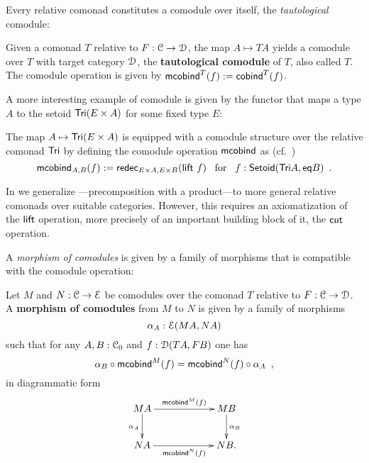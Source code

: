 \documentclass[a4paper,USenglish]{lipics}
\newcommand{\fat}[1]{\textbf{#1}}
\begin{document}
\noindent
Every relative comonad constitutes a comodule over itself, the \emph{tautological} comodule:

\begin{defn}
\label{def:tautological_comodule}
  Given a comonad $T$ relative to $F:\C\to\D$, the map $A \mapsto TA$ yields a comodule over $T$ 
  with target category $\D$, the \textbf{tautological comodule} of $T$, also called $T$.
  The comodule operation is given by
    $  \mcobind^T(f) := \cobind^T(f)$. 
\end{defn}

\noindent
A more interesting example of comodule is given by the functor that maps a type $A$ to the setoid $\Tri(E\times A)$
for some fixed type $E$:
\begin{ex}\label{ex_tri_prod_comod}
   The map $A \mapsto \Tri(E\times A)$ is equipped with a comodule structure over the relative comonad $\Tri$ by
   defining the comodule operation $\mcobind$ as (cf.\ )
     \[ \mcobind_{A,B} (f) := \redec_{E\times A, E\times B} (\extend~f) \enspace \text{ for } \enspace f : \Setoid(\Tri A, \eq B) \enspace . \]
\end{ex}

In  we generalize ---precomposition with a product---to more general relative comonads over suitable categories.
However, this requires an axiomatization of the $\extend$ operation, more precisely of an important building block of it, the
$\cut$ operation.

A \emph{morphism of comodules} is given by a family of morphisms that is compatible with 
the comodule operation:

\begin{defn}
\label{def:morphism_of_comodules}
 Let $M$ and $N : \C \to \E$ be comodules over the comonad $T$ relative to  $F:\C \to \D$.
 A \fat{morphism of comodules} from $M$ to $N$ is given by a family of morphisms 
   \[ \alpha_A:\E(MA,NA) \]
 such that for any $A,B:\C_0$ and $f : \D(TA,FB)$ one has
 \[\comp{\mcobind^M(f)}{\alpha_B} = \comp{\alpha_A}{\mcobind^N(f)} \enspace, \]
 in diagrammatic form
 \[
  \begin{xy}
   \xymatrix@C=6em{
     MA  \ar[r]^{\mcobind^M(f)}  \ar[d]_{\alpha_A} & MB \ar[d]^{\alpha_B} \\
     NA  \ar[r]_{\mcobind^N(f)}  & NB.
   }
  \end{xy}
 \]

\end{defn}
\end{document}
